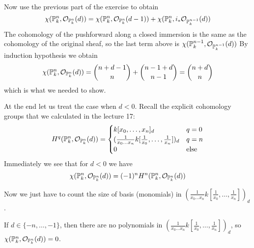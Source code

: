 \begin{exercise}{3}
\begin{enumerate}
{                Now use the previous part of the exercise to obtain
                \begin{equation*}
                    \chi(\mathbb{P}^n_k, \mathcal{O}_{\mathbb{P}^n_k}(d)) = 
                    \chi(\mathbb{P}^n_k, \mathcal{O}_{\mathbb{P}^n_k}(d-1)) +
                    \chi(\mathbb{P}^n_k, i_* \mathcal{O}_{\mathbb{P}^{n-1}_k}(d))
                \end{equation*}
                The cohomology of the pushforward along a closed immersion is
                the same as the cohomology of the original sheaf, so the last
                term above is $\chi(\mathbb{P}^{n-1}_k,
                \mathcal{O}_{\mathbb{P}^{n-1}_k}(d))$
                By induction hypothesis we obtain
                \begin{equation*}
                    \chi(\mathbb{P}^n_k, \mathcal{O}_{\mathbb{P}^n_k}(d)) = 
                    \binom{n + d - 1}{n} + \binom{n - 1 + d}{n - 1} = \binom{n +
                    d}{n}
                \end{equation*}
                which is what we needed to show.

                At the end let us treat the case when $d < 0$.
                Recall the explicit cohomology groups that we
                calculated in the lecture 17:
                \begin{equation*}
                    H^q(\mathbb{P}^n_k, \mathcal{O}_{\mathbb{P}^n_k}(d)) =
                    \begin{cases}
                        k[x_0, \dots, x_n]_d & q = 0 \\
                        (\frac{1}{x_0 \dots x_n} k[\frac{1}{x_0}, \dots,
                        \frac{1}{x_n}])_d & q = n \\
                        0 & \text{else}
                    \end{cases}
                \end{equation*}
                Immediately we see that for $d < 0$ we have
                \begin{equation*}
                    \chi(\mathbb{P}^n_k, \mathcal{O}_{\mathbb{P}^n_k}(d)) = (-1)^n
                    H^n(\mathbb{P}^n_k, \mathcal{O}_{\mathbb{P}^n_k}(d))
                \end{equation*}

                Now we just have to count the size of basis (monomials) in
                $(\frac{1}{x_0 \dots x_n} k[\frac{1}{x_0}, \dots,
                \frac{1}{x_n}])_d$.

                If $d \in \{-n, \dots, -1\}$, then there are no polynomials in
                $(\frac{1}{x_0 \dots x_n} k[\frac{1}{x_0}, \dots,
                \frac{1}{x_n}])_d$, so $\chi(\mathbb{P}^n_k,
                \mathcal{O}_{\mathbb{P}^n_k}(d)) = 0$.

}
\end{enumerate}
\end{exercise}
